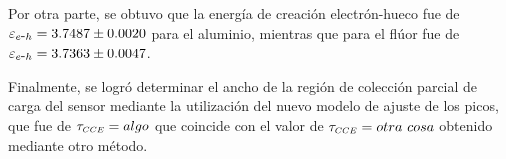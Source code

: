 Por otra parte, se obtuvo que la energía de creación electrón-hueco fue de $\varepsilon_{e\mbox{-}h} = 3.7487 \pm 0.0020$ para el aluminio, mientras que para el flúor fue de $\varepsilon_{e\mbox{-}h} = 3.7363 \pm 0.0047$.

Finalmente, se logró determinar el ancho de la región de colección parcial de carga del sensor mediante la utilización del nuevo modelo de ajuste de los picos, que fue de $\tau_{\scaleto{CCE}{4pt}} = algo$ que coincide con el valor de $\tau_{\scaleto{CCE}{4pt}} = otra\ cosa$ obtenido mediante otro método.




